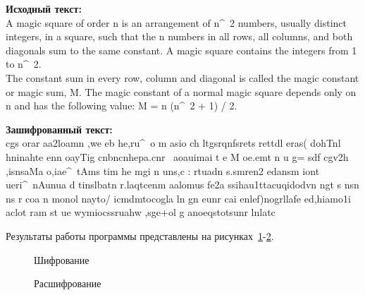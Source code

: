 \textbf{Исходный текст:} \\
    A magic square of order n is an arrangement of n\^~2 numbers,
    usually distinct integers, in a square, such that the n numbers
    in all rows, all columns, and both diagonals sum to the same constant.
    A magic square contains the integers from 1 to n\^~2. \\
    The constant sum in every row, column and diagonal is called the magic
    constant or magic sum, M. The magic constant of a normal magic square
    depends only on n and has the following value: M = n (n\^~2 + 1) / 2.

\textbf{Зашифрованный текст:} \\
    cgs orar aa2loamn ,we eb he,ru\^~o m asio ch ltgsrqnfsrets rettdl eras(
    dohTnl hninahte   enn  oayTig  cnbncnhepa.cnr
    ~aoauimai t e M oe.emt n u g= sdf cgv2h  ,isnsaMa o,iae\^~tAms  tim he
    mgi n  uns,c  : rtuadn s.smren2 edansm iont ueri\^~nAunua  d tinslbatn
    r.laqtcenm aalomus fe2a ssihau1ttacuqidodvn ngt s nsn ns   r  coa n
    monol nayto/ icmdmtocogla  ln  gn  eunr cai enlef)nogrllafe ed,hiamo1i
    aclot ram st ue  wymiocssruahw ,sge+ol g anoeqstotsunr lnlatc 

Результаты работы программы представлены на рисунках~\ref{ris:encode-test-4}-\ref{ris:decode-test-4}.

\vspace{\baselineskip}
\begin{figure}[H]
    \caption{Шифрование}
\label{ris:encode-test-4}
\end{figure}

\vspace{\baselineskip}
\begin{figure}[H]
    \caption{Расшифрование}
\label{ris:decode-test-4}
\end{figure}
